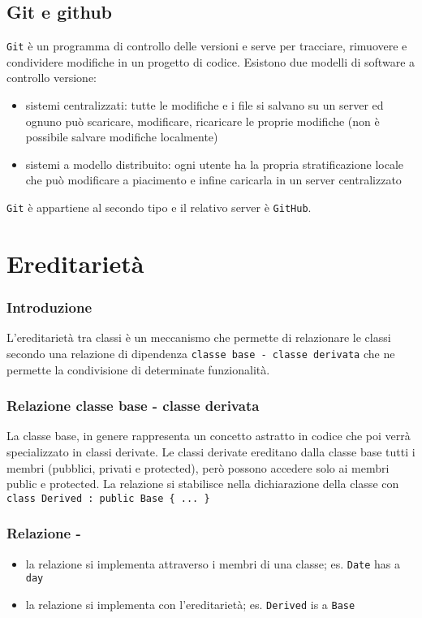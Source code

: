 \documentclass[a4paper]{article}
\begin{document}
\subsection{Git e github}
\verb|Git| è un programma di controllo delle versioni e serve per tracciare, rimuovere e condividere modifiche in un progetto di codice.
Esistono due modelli di software a controllo versione:
\begin{itemize}
	\item sistemi centralizzati: tutte le modifiche e i file si salvano su un server ed ognuno può scaricare, modificare, ricaricare
	le proprie modifiche (non è possibile salvare modifiche localmente)
	\item sistemi a modello distribuito: ogni utente ha la propria stratificazione locale che può modificare a piacimento e infine
	caricarla in un server centralizzato
\end{itemize}
\verb|Git| è appartiene al secondo tipo e il relativo server è \verb|GitHub|.

\newpage

\section{Ereditarietà}
\subsubsection*{Introduzione}
L'ereditarietà tra classi è un meccanismo che permette di relazionare le classi secondo una relazione di dipendenza 
\verb|classe base - classe derivata| che ne permette la condivisione di determinate funzionalità.

\subsubsection*{Relazione classe base - classe derivata}
La classe base, in genere rappresenta un concetto astratto in codice che poi verrà specializzato in classi derivate. Le classi
derivate ereditano dalla classe base tutti i membri (pubblici, privati e protected), però possono accedere solo ai membri
public e protected. La relazione si stabilisce nella dichiarazione della classe con \verb|class Derived : public Base { ... }|

\subsubsection*{Relazione  - }
\begin{itemize}
	\item la relazione \textbf{} si implementa attraverso i membri di una classe; es. \verb|Date| has a \verb|day|
	\item la relazione \textbf{} si implementa con l'ereditarietà; es. \verb|Derived| is a \verb|Base|
\end{itemize}
\end{document}

